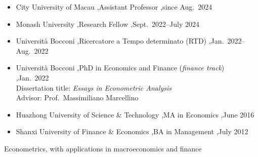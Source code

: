 \documentclass[letterpaper,10pt]{article}
\begin{document}


\begin{itemize}
  \item City University of Macau \sep Assistant Professor \sep since Aug.\ 2024
  \item Monash University \sep Research Fellow \sep Sept.\ 2022--July 2024
  \item Universit\`a Bocconi \sep Ricercatore a Tempo determinato (RTD) \sep Jan.\ 2022--Aug.\ 2022
\end{itemize}


\begin{itemize}
  \item Universit\`a Bocconi \sep PhD in Economics and Finance (\emph{finance track}) \sep Jan.\ 2022\\
        Dissertation title: \textit{Essays in Econometric Analysis}\\
        Advisor: Prof.\ Massimiliano Marcellino
  \item Huazhong University of Science \& Technology \sep MA in Economics \sep June 2016
  \item Shanxi University of Finance \& Economics \sep BA in Management \sep July 2012
\end{itemize}

Econometrics, with applications in macroeconomics and finance

\end{document}
